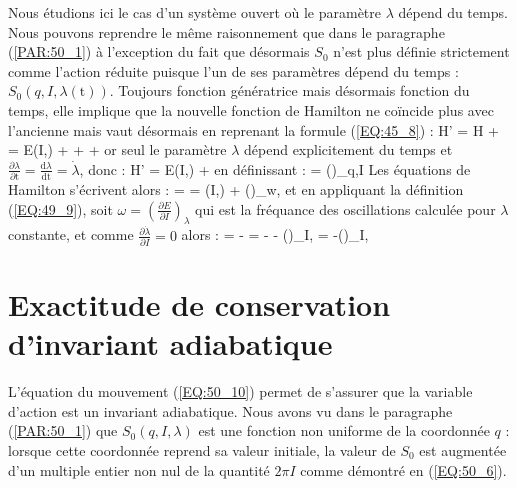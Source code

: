 Nous \'{e}tudions ici le cas d'un syst\`{e}me ouvert o\`{u} le param\`{e}tre $\lambda$ d\'{e}pend du temps. Nous pouvons reprendre le m\^{e}me raisonnement que dans le paragraphe (\ref{PAR:50_1}) \`{a} l'exception du fait que d\'{e}sormais $S_{0}$ n'est plus d\'{e}finie strictement comme l'action r\'{e}duite puisque l'un de ses param\`{e}tres d\'{e}pend du temps : $S_{0}(q,I,\lambda(\mathrm{t}))$. Toujours fonction g\'{e}n\'{e}ratrice mais d\'{e}sormais fonction du temps, elle implique que la nouvelle fonction de Hamilton ne co\"{i}ncide plus avec l'ancienne mais vaut d\'{e}sormais en reprenant la formule (\ref{EQ:45_8}) :
\benn
	H' = H +  = E(I,\lambda) +  +  + 
\eenn
or seul le param\`{e}tre $\lambda$ d\'{e}pend explicitement du temps et $\frac{\partial\lambda}{\partial\mathrm{t}} = \frac{\mathrm{d}\lambda}{\mathrm{dt}} = \dot{\lambda}$, donc :
\be
	H' = E(I,\lambda) + \Lambda\dot{\lambda} \label{EQ:50_8}
\ee
en d\'{e}finissant :
\be
	\Lambda = \left(\right)_{q,I} \label{EQ:50_9}
\ee
Les \'{e}quations de Hamilton s'\'{e}crivent alors :
\be
	 =  = \omega(I,\lambda) + \left(\right)_{w,\lambda}\dot{\lambda} \label{EQ:50_11}
\ee
et en appliquant la d\'{e}finition (\ref{EQ:49_9}), soit $\omega = \left(\frac{\partial E}{\partial I}\right)_{\lambda}$ qui est la fr\'{e}quance des oscillations calcul\'{e}e pour $\lambda$ constante, et comme $\frac{\partial\dot{\lambda}}{\partial I} = 0$ alors :
\be
	 = - = - - \left(\right)_{I,\lambda}\dot{\lambda} = -\left(\right)_{I,\lambda}\dot{\lambda} \label{EQ:50_10}
\ee

\section{Exactitude de conservation d'invariant adiabatique}\label{PAR:51}

L'\'{e}quation du mouvement (\ref{EQ:50_10}) permet de s'assurer que la variable d'action est un invariant adiabatique. Nous avons vu dans le paragraphe (\ref{PAR:50_1}) que $S_{0}(q,I,\lambda)$ est une fonction non uniforme de la coordonn\'{e}e $q$ : lorsque cette coordonn\'{e}e reprend sa valeur initiale, la valeur de $S_{0}$ est augment\'{e}e d'un multiple entier non nul de la quantit\'{e} $2\pi I$ comme d\'{e}montr\'{e} en (\ref{EQ:50_6}).

